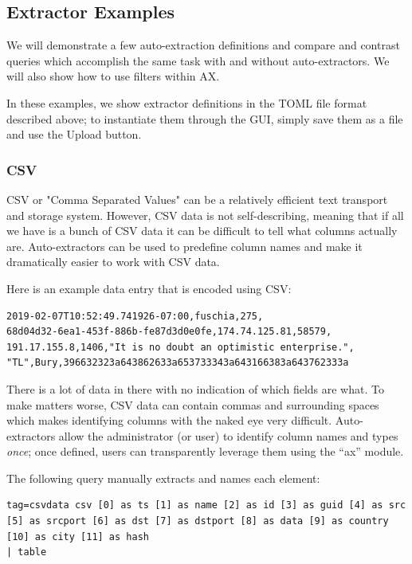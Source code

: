 \subsection{Extractor Examples}

We will demonstrate a few auto-extraction definitions and compare and
contrast queries which accomplish the same task with and without
auto-extractors. We will also show how to use filters within AX.

In these examples, we show extractor definitions in the TOML file format
described above; to instantiate them through the GUI, simply save them as a file and use the Upload button.

\subsubsection{CSV}

CSV or "Comma Separated Values" can be a relatively efficient text
transport and storage system. However, CSV data is not self-describing,
meaning that if all we have is a bunch of CSV data it can be difficult
to tell what columns actually are. Auto-extractors can be used to
predefine column names and make it dramatically easier to work with CSV
data.

Here is an example data entry that is encoded using CSV:

\begin{Verbatim}[breaklines=true]
2019-02-07T10:52:49.741926-07:00,fuschia,275,
68d04d32-6ea1-453f-886b-fe87d3d0e0fe,174.74.125.81,58579,
191.17.155.8,1406,"It is no doubt an optimistic enterprise.",
"TL",Bury,396632323a643862633a653733343a643166383a643762333a
\end{Verbatim}

There is a lot of data in there with no indication of which fields are
what. To make matters worse, CSV data can contain commas and surrounding
spaces which makes identifying columns with the naked eye very
difficult. Auto-extractors allow the administrator (or user) to identify column
names and types \emph{once}; once defined, users can transparently leverage
them using the ``ax'' module.

The following query manually extracts and names each element:

\begin{Verbatim}[breaklines=true]
tag=csvdata csv [0] as ts [1] as name [2] as id [3] as guid [4] as src 
[5] as srcport [6] as dst [7] as dstport [8] as data [9] as country 
[10] as city [11] as hash
| table
\end{Verbatim}

